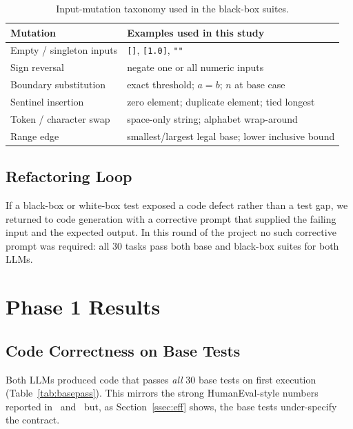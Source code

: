 \documentclass[journal]{IEEEtran}
\begin{document}
\begin{table}[!t]
\centering
\caption{Input-mutation taxonomy used in the black-box suites.}
\label{tab:mut}
\renewcommand{\arraystretch}{1.20}
\begin{tabular}{@{}p{} p{}@{}}
\toprule
\textbf{Mutation} & \textbf{Examples used in this study} \\
\midrule
Empty / singleton inputs & \texttt{[]}, \texttt{[1.0]},
                           \texttt{""} \\
Sign reversal            & negate one or all numeric
                           inputs \\
Boundary substitution    & exact threshold; $a{=}b$;
                           $n$ at base case \\
Sentinel insertion       & zero element; duplicate element;
                           tied longest \\
Token / character swap   & space-only string; alphabet
                           wrap-around \\
Range edge               & smallest/largest legal base;
                           lower inclusive bound \\
\bottomrule
\end{tabular}
\end{table}

\subsection{Refactoring Loop}
If a black-box or white-box test exposed a code defect rather
than a test gap, we returned to code generation with a
corrective prompt that supplied the failing input and the
expected output. In this round of the project no such
corrective prompt was required: all 30 tasks pass both base
and black-box suites for both LLMs.

\section{Phase 1 Results}
\label{sec:results}

\subsection{Code Correctness on Base Tests}
Both LLMs produced code that passes \emph{all} 30 base tests
on first execution (Table~\ref{tab:basepass}). This mirrors
the strong HumanEval-style numbers reported
in~\cite{liu2023evalplus} and~\cite{siddiq2024junit} but, as
Section~\ref{ssec:eff} shows, the base tests under-specify the
contract.
\end{document}

